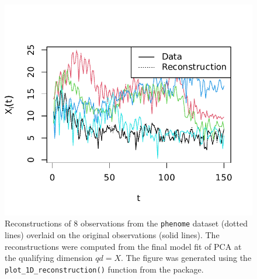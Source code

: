 \begin{figure}
    \centering
    \includegraphics[width=0.75\linewidth]{figures/phoneme-reconstruction.pdf}
    \caption{Reconstructions of $8$ observations from the \texttt{phenome} dataset (dotted lines) overlaid on the original observations (solid lines). The reconstructions were computed from the final model fit of PCA at the qualifying dimension $qd=X$. The figure was generated using the \texttt{plot\_1D\_reconstruction()} function from the  package.}
    \label{fig:phoneme-reconstruction}
\end{figure}